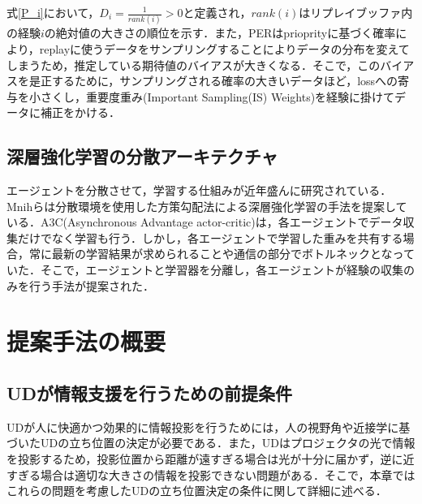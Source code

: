 \documentclass[12pt]{sonota/aislab}
\begin{document}
式\ref{P_i}において，$D_{i}=\frac{1}{rank(i)}>0$と定義され，$rank(i)$はリプレイブッファ内の経験$i$の絶対値の大きさの順位を示す．また，PERはprioprityに基づく確率により，replayに使うデータをサンプリングすることによりデータの分布を変えてしまうため，推定している期待値のバイアスが大きくなる．そこで，このバイアスを是正するために，サンプリングされる確率の大きいデータほど，lossへの寄与を小さくし，重要度重み(Important Sampling(IS) Weights)を経験に掛けてデータに補正をかける．

\subsection{深層強化学習の分散アーキテクチャ}
エージェントを分散させて，学習する仕組みが近年盛んに研究されている\cite{A3C}\cite{Gorila}\cite{Ape-X}．Mnihらは分散環境を使用した方策勾配法による深層強化学習の手法を提案している\cite{A3C}．A3C(Asynchronous Advantage actor-critic)は，各エージェントでデータ収集だけでなく学習も行う．しかし，各エージェントで学習した重みを共有する場合，常に最新の学習結果が求められることや通信の部分でボトルネックとなっていた．そこで，エージェントと学習器を分離し，各エージェントが経験の収集のみを行う手法が提案された\cite{Gorila}\cite{Ape-X}．

\section{提案手法の概要}
\subsection{UDが情報支援を行うための前提条件}\label{投影支援条件}
UDが人に快適かつ効果的に情報投影を行うためには，人の視野角や近接学に基づいたUDの立ち位置の決定が必要である．また，UDはプロジェクタの光で情報を投影するため，投影位置から距離が遠すぎる場合は光が十分に届かず，逆に近すぎる場合は適切な大きさの情報を投影できない問題がある．そこで，本章ではこれらの問題を考慮したUDの立ち位置決定の条件に関して詳細に述べる．
\end{document}
